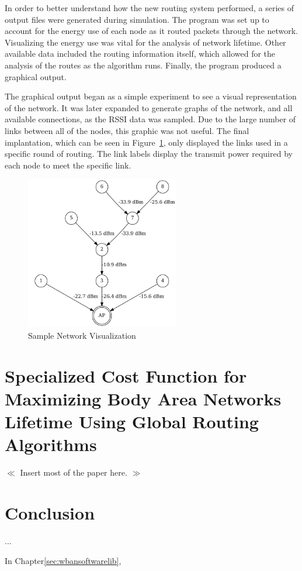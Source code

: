 \documentclass{article}
\begin{document}
In order to better understand how the new routing system performed, a series of output files were generated during simulation. The program was set up to account for the energy use of each node as it routed packets through the network. Visualizing the energy use was vital for the analysis of network lifetime. Other available data included the routing information itself, which allowed for the analysis of the routes as the algorithm runs. Finally, the program produced a graphical output.

The graphical output began as a simple experiment to see a visual representation of the network. It was later expanded to generate graphs of the network, and all available connections, as the RSSI data was sampled. Due to the large number of links between all of the nodes, this graphic was not useful. The final implantation, which can be seen in Figure~\ref{fig:networkgraph1}, only displayed the links used in a specific round of routing. The link labels display the transmit power required by each node to meet the specific link.

\begin{figure}[htb]
\begin{center}
\includegraphics[width=0.6\textwidth]{figures/networkgraph1.pdf}
\end{center}
\caption{Sample Network Visualization}
\label{fig:networkgraph1}
\end{figure}

\section{Specialized Cost Function for Maximizing Body Area Networks Lifetime Using Global Routing Algorithms}\label{sec:costfunction}
$\ll$ Insert most of the paper here. $\gg$

\section{Conclusion}
...

In Chapter\ref{sec:wbansoftwarelib},

\pagebreak

\listoffigures


{}

\end{document}
